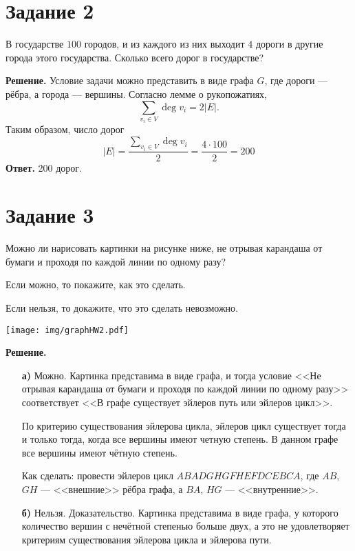 \documentclass[a4paper,12pt]{article}
\begin{document}
\section*{Задание 2}
В государстве $100$ городов, и из каждого из них выходит $4$ дороги в другие города этого государства. Сколько всего дорог в государстве?\par
\vspace{15 pt}
{\bf Решение.} Условие задачи можно представить в виде графа $G$, где дороги --- рёбра, а города --- вершины. Согласно лемме о рукопожатиях,
$$\sum_{v_i\in V}\deg v_i=2|E|.$$
Таким образом, число дорог
$$|E|=\frac{\displaystyle \sum_{v_i\in V}\deg v_i}{2}=\frac{4\cdot100}{2}=200$$
{\bf Ответ.} 200 дорог.\par
\newpage

\section*{Задание 3}
Можно ли нарисовать картинки на рисунке ниже, не отрывая карандаша от бумаги и проходя по каждой линии по одному разу?

Если можно, то покажите, как это сделать.

Если нельзя, то докажите, что это сделать невозможно.
\vspace{-40 pt}
\begin{center}
\texttt{[image: img/graphHW2.pdf]}
\end{center}
{\bf Решение.}
\begin{itemize}
\item[{\bf а)}] Можно. Картинка представима в виде графа, и тогда условие <<Не отрывая карандаша от бумаги и проходя по каждой линии по одному разу>> соответствует <<В графе существует эйлеров путь или эйлеров цикл>>.\par
По критерию существования эйлерова цикла, эйлеров цикл существует тогда и только тогда, когда все вершины имеют четную степень. В данном графе все вершины имеют чётную степень. \par Как сделать: провести эйлеров цикл $ABADGHGFHEFDCEBCA$, где $AB$, $GH$ --- <<внешние>> рёбра графа, а $BA$, $HG$ --- <<внутренние>>.
\item[{\bf б)}] Нельзя. Доказательство. Картинка представима в виде графа, у которого количество вершин с нечётной степенью больше двух, а это не удовлетворяет критериям существования эйлерова цикла и эйлерова пути.
\end{itemize}
\newpage
\end{document}
